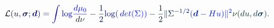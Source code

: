 \documentclass[12pt]{article}
\begin{document}
\makeatletter
\renewcommand*{\@textcolor}[3]{%
  \protect\leavevmode
  \begingroup
    \color#1{#2}#3%
  \endgroup
}
\makeatother
\begin{displaymath}
\mathcal { \mathcolor[RGB]{0,0,15}{L} } \mathcolor[RGB]{0,0,30}{(} \mathcolor[RGB]{0,0,45}{u} \mathcolor[RGB]{0,0,60}{,} \boldsymbol { \mathcolor[RGB]{0,0,75}{\sigma} } \mathcolor[RGB]{0,0,90}{;} \boldsymbol { \mathcolor[RGB]{0,0,105}{d} } \mathcolor[RGB]{0,0,120}{)} \mathcolor[RGB]{0,0,135}{=} \mathcolor[RGB]{0,0,150}{\int} \mathrm { \mathcolor[RGB]{0,0,165}{l} \mathcolor[RGB]{0,0,180}{o} \mathcolor[RGB]{0,0,195}{g} } \mathcolor[RGB]{0,0,210}{\frac { \mathcolor[RGB]{0,0,225}{d} \mathcolor[RGB]{0,0,240}{\mu} _ { \mathcolor[RGB]{0,0,255}{0} } } { \mathcolor[RGB]{0,15,0}{d} \mathcolor[RGB]{0,15,15}{\nu} } } \mathcolor[RGB]{0,15,30}{-} \mathcolor[RGB]{0,15,45}{\frac { \mathcolor[RGB]{0,15,60}{1} } { \mathcolor[RGB]{0,15,75}{2} } } \mathrm { \mathcolor[RGB]{0,15,90}{l} \mathcolor[RGB]{0,15,105}{o} \mathcolor[RGB]{0,15,120}{g} } \mathcolor[RGB]{0,15,135}{(} \mathcolor[RGB]{0,15,150}{\operatorname*} { \mathcolor[RGB]{0,15,165}{d} \mathcolor[RGB]{0,15,180}{e} \mathcolor[RGB]{0,15,195}{t} } \mathcolor[RGB]{0,15,210}{(} \mathcolor[RGB]{0,15,225}{\Sigma} \mathcolor[RGB]{0,15,240}{)} \mathcolor[RGB]{0,15,255}{)} \mathcolor[RGB]{0,30,0}{-} \mathcolor[RGB]{0,30,15}{\frac { \mathcolor[RGB]{0,30,30}{1} } { \mathcolor[RGB]{0,30,45}{2} } } \mathcolor[RGB]{0,30,60}{\|} \mathcolor[RGB]{0,30,75}{\Sigma} ^ { \mathcolor[RGB]{0,30,90}{-} \mathcolor[RGB]{0,30,105}{1} \mathcolor[RGB]{0,30,120}{/} \mathcolor[RGB]{0,30,135}{2} } \mathcolor[RGB]{0,30,150}{(} \boldsymbol { \mathcolor[RGB]{0,30,165}{d} } \mathcolor[RGB]{0,30,180}{-} \mathcolor[RGB]{0,30,195}{H} \mathcolor[RGB]{0,30,210}{u} \mathcolor[RGB]{0,30,225}{)} \mathcolor[RGB]{0,30,240}{\|} ^ { \mathcolor[RGB]{0,30,255}{2} } \mathcolor[RGB]{0,45,0}{\nu} \mathcolor[RGB]{0,45,15}{(} \mathcolor[RGB]{0,45,30}{d} \mathcolor[RGB]{0,45,45}{u} \mathcolor[RGB]{0,45,60}{,} \mathcolor[RGB]{0,45,75}{d} \boldsymbol { \mathcolor[RGB]{0,45,90}{\sigma} } \mathcolor[RGB]{0,45,105}{)} \mathcolor[RGB]{0,45,120}{.}
\end{displaymath}
\end{document}
